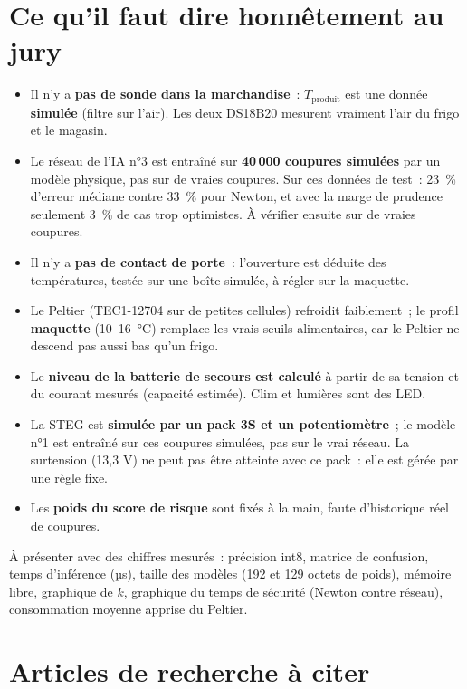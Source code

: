 \section{Ce qu'il faut dire honnêtement au jury}\label{sec:jury}
\begin{itemize}
  \item Il n'y a \textbf{pas de sonde dans la marchandise}~: $T_{\text{produit}}$ est une donnée \textbf{simulée} (filtre sur l'air). Les deux DS18B20 mesurent vraiment l'air du frigo et le magasin.
  \item Le réseau de l'IA n°3 est entraîné sur \textbf{40\,000 coupures simulées} par un modèle physique, pas sur de vraies coupures. Sur ces données de test~: 23~\% d'erreur médiane contre 33~\% pour Newton, et avec la marge de prudence seulement 3~\% de cas trop optimistes. À vérifier ensuite sur de vraies coupures.
  \item Il n'y a \textbf{pas de contact de porte}~: l'ouverture est déduite des températures, testée sur une boîte simulée, à régler sur la maquette.
  \item Le Peltier (TEC1-12704 sur de petites cellules) refroidit faiblement~; le profil \textbf{maquette} (10--16~°C) remplace les vrais seuils alimentaires, car le Peltier ne descend pas aussi bas qu'un frigo.
  \item Le \textbf{niveau de la batterie de secours est calculé} à partir de sa tension et du courant mesurés (capacité estimée). Clim et lumières sont des LED.
  \item La STEG est \textbf{simulée par un pack 3S et un potentiomètre}~; le modèle n°1 est entraîné sur ces coupures simulées, pas sur le vrai réseau. La surtension (13,3 V) ne peut pas être atteinte avec ce pack~: elle est gérée par une règle fixe.
  \item Les \textbf{poids du score de risque} sont fixés à la main, faute d'historique réel de coupures.
\end{itemize}
À présenter avec des chiffres mesurés~: précision int8, matrice de confusion, temps d'inférence (µs), taille des modèles (192 et 129 octets de poids), mémoire libre, graphique de $k$, graphique du temps de sécurité (Newton contre réseau), consommation moyenne apprise du Peltier.

\section{Articles de recherche à citer}\label{sec:articles}

